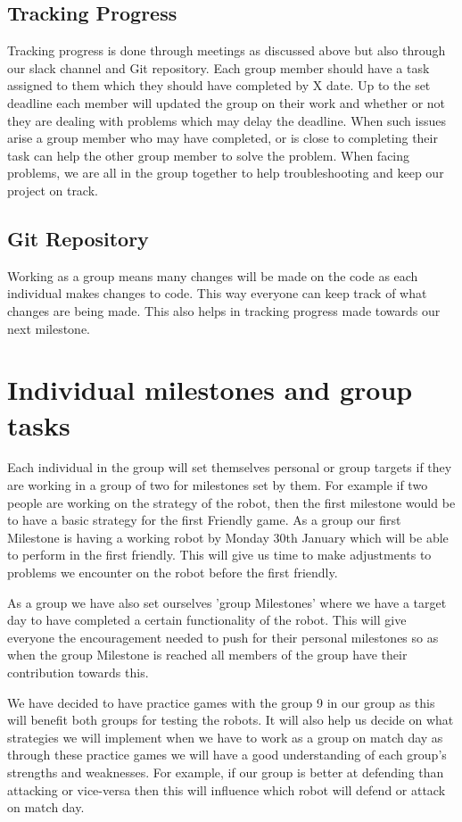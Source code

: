 \documentclass{article}
\begin{document}
\subsection{Tracking Progress}
Tracking progress is done through meetings as discussed above but also through
our slack channel and Git repository. Each group member should have a task
assigned to them which they should have completed by X date. Up to the set
deadline each member will updated the group on their work and whether or not
they are dealing with problems which may delay the deadline. When such issues
arise a group member who may have completed, or is close to completing their
task can help the other group member to solve the problem. When facing problems,
we are all in the group together to help troubleshooting and keep our project on
track.

\subsection{Git Repository}
Working as a group means many changes will be made on the code as each
individual makes changes to code.  This way
everyone can keep track of what changes are being made. This also helps in
tracking progress made towards our next milestone.


\section{Individual milestones and group tasks}
Each individual in the group will set themselves personal or group targets if
they are working in a group of two for milestones set by them. For example if
two people are working on the strategy of the robot, then the first milestone
would be to have a basic strategy for the first Friendly game. As a group our
first Milestone is having a working robot by Monday 30th January which will be
able to perform in the first friendly. This will give us time to make
adjustments to problems we encounter on the robot before the first friendly.

As a group we have also set ourselves 'group Milestones' where we have a target
day to have completed a certain functionality of the robot. This will give
everyone the encouragement needed to push for their personal milestones so as
when the group Milestone is reached all members of the group have their
contribution towards this.

We have decided to have practice games with the group 9 in our group as this
will benefit both groups for testing the robots. It will also help us decide on
what strategies we will implement when we have to work as a group on match day
as through these practice games we will have a good understanding of each
group's strengths and weaknesses. For example, if our group is better at
defending than attacking or vice-versa then this will influence which robot will
defend or attack on match day.
\end{document}
